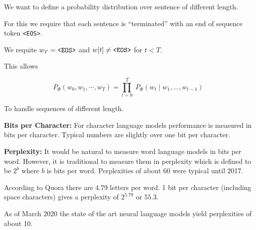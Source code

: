 {

We want to define a probability distribution over sentence of different length.

\vfill
For this we require that each sentence is ``terminated'' with an end of sequence token {\tt <EOS>}.

\vfill
We requite $w_T = \mbox{\tt <EOS>}$ and $w[t] \not = \mbox{\tt <EOS>}$ for $t < T$.

\vfill
This allows

$$P_\Phi(w_0, w_1, \cdots, w_T) = \prod_{t=0}^T\;P_\Phi(w_t\;|\;w_1,\ldots,w_{t-1})$$

To handle sequences of different length.



{\bf Bits per Character:}
For character language models performance is measured in bits per character.  Typical numbers are slightly over one bit per character.

\vfill
{\bf Perplexity:}
It would be natural to measure word language models in bits per word.  However, it is traditional to measure them in perplexity which is defined to be
$2^b$ where $b$ is bits per word.  Perplexities of about 60 were typical until 2017.


\vfill
According to Quora there are 4.79 letters per word.  1 bit per character (including space characters) gives a perplexity of $2^{5.79}$ or $55.3$.


As of March 2020 the state of the art neural language models
yield perplexities of about 10.


}

